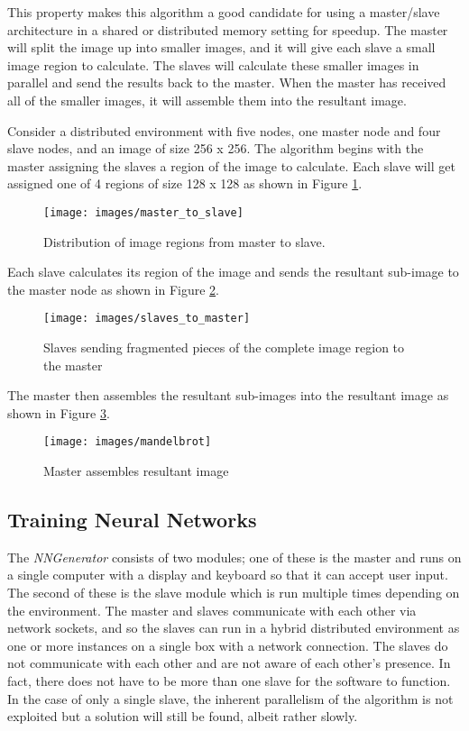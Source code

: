 This property makes this algorithm a good candidate for using a master/slave architecture in a shared or distributed memory setting for speedup. 
The master will split the image up into smaller images, and it will give each slave a small image region to calculate. 
The slaves will calculate these smaller images in parallel and send the results back to the master. 
When the master has received all of the smaller images, it will assemble them into the resultant image.

Consider a distributed environment with five nodes, one master node and four slave nodes, and an image of size 256 x 256. 
The algorithm begins with the master assigning the slaves a region of the image to calculate. 
Each slave will get assigned one of 4 regions of size 128 x 128 as shown in Figure \ref{m2s}.

\begin{figure}[h!]
  \centering
  \texttt{[image: images/master\_to\_slave]}
  \caption{Distribution of image regions from master to slave.}
  \label{m2s}
\end{figure}

Each slave calculates its region of the image and sends the resultant sub-image to the master node as shown in Figure \ref{s2m}.

\begin{figure}[h!]
  \centering
  \texttt{[image: images/slaves\_to\_master]}
  \caption{Slaves sending fragmented pieces of the complete image region to the master}
  \label{s2m}
\end{figure}

The master then assembles the resultant sub-images into the resultant image as shown in Figure \ref{resultant_image}. 

\begin{figure}[h!]
  \centering
  \texttt{[image: images/mandelbrot]}
  \caption{Master assembles resultant image}
  \label{resultant_image}
\end{figure}

\subsection{Training Neural Networks}
The {\em NNGenerator} consists of two modules; one of these is the master and runs on a single computer with a display and keyboard so that it can accept user input.
The second of these is the slave module which is run multiple times depending on the environment.
The master and slaves communicate with each other via network sockets, and so the slaves can run in a hybrid distributed environment as one or more instances on a single box with a network connection.
The slaves do not communicate with each other and are not aware of each other's presence.
In fact, there does not have to be more than one slave for the software to function.
In the case of only a single slave, the inherent parallelism of the algorithm is not exploited but a solution will still be found, albeit rather slowly.


